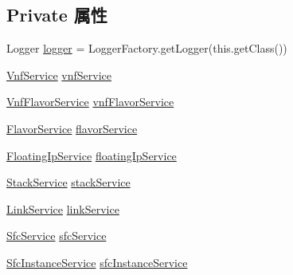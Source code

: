 \subsection*{Private 属性}
\begin{DoxyCompactItemize}
\item 
Logger \mbox{\hyperlink{classcom_1_1example_1_1demo_1_1templates_1_1_json_template_lexer_a058a62b5bb263223a598aaf2cd81b1ff}{logger}} = Logger\+Factory.\+get\+Logger(this.\+get\+Class())
\item 
\mbox{\hyperlink{classcom_1_1example_1_1demo_1_1service_1_1_vnf_service}{Vnf\+Service}} \mbox{\hyperlink{classcom_1_1example_1_1demo_1_1templates_1_1_json_template_lexer_aca9c1e9ae34fb79219fc145c1102eb83}{vnf\+Service}}
\item 
\mbox{\hyperlink{classcom_1_1example_1_1demo_1_1service_1_1_vnf_flavor_service}{Vnf\+Flavor\+Service}} \mbox{\hyperlink{classcom_1_1example_1_1demo_1_1templates_1_1_json_template_lexer_a6530b1aad2b364a97841d056dd706419}{vnf\+Flavor\+Service}}
\item 
\mbox{\hyperlink{classcom_1_1example_1_1demo_1_1service_1_1_flavor_service}{Flavor\+Service}} \mbox{\hyperlink{classcom_1_1example_1_1demo_1_1templates_1_1_json_template_lexer_a1bec49754916a2f8e156173eaf1462dc}{flavor\+Service}}
\item 
\mbox{\hyperlink{classcom_1_1example_1_1demo_1_1service_1_1_floating_ip_service}{Floating\+Ip\+Service}} \mbox{\hyperlink{classcom_1_1example_1_1demo_1_1templates_1_1_json_template_lexer_a0f3964ef7520c0528960109d2c405f28}{floating\+Ip\+Service}}
\item 
\mbox{\hyperlink{classcom_1_1example_1_1demo_1_1service_1_1_stack_service}{Stack\+Service}} \mbox{\hyperlink{classcom_1_1example_1_1demo_1_1templates_1_1_json_template_lexer_ac0c468224c2fb4f1a99a504b5b8feb3a}{stack\+Service}}
\item 
\mbox{\hyperlink{classcom_1_1example_1_1demo_1_1service_1_1_link_service}{Link\+Service}} \mbox{\hyperlink{classcom_1_1example_1_1demo_1_1templates_1_1_json_template_lexer_a39c6f8ab7c590af2c5ddbcd3b9056a62}{link\+Service}}
\item 
\mbox{\hyperlink{classcom_1_1example_1_1demo_1_1service_1_1_sfc_service}{Sfc\+Service}} \mbox{\hyperlink{classcom_1_1example_1_1demo_1_1templates_1_1_json_template_lexer_a32ebef5572b7c8992735b5cc5003b1a3}{sfc\+Service}}
\item 
\mbox{\hyperlink{classcom_1_1example_1_1demo_1_1service_1_1_sfc_instance_service}{Sfc\+Instance\+Service}} \mbox{\hyperlink{classcom_1_1example_1_1demo_1_1templates_1_1_json_template_lexer_af9d24fc3a1bc79aa014e410f9dc36f83}{sfc\+Instance\+Service}}

\end{DoxyCompactItemize}
